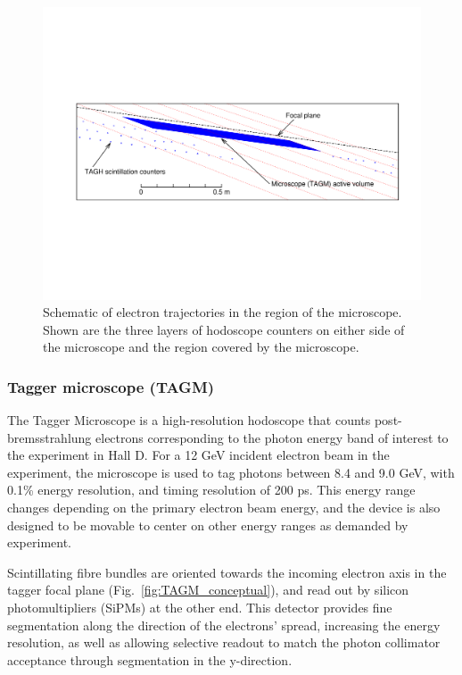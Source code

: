 \begin{figure}[tbp]
\begin{center}
      \includegraphics[width=0.95\linewidth,viewport=80 200 750 400]{figures/BEAM_taggerdetectors.pdf}
\caption{Schematic of electron trajectories in the region of the microscope. Shown are the three layers of hodoscope counters on either side of the microscope and the 
               region covered by the microscope.
       \label{fig:beam:BEAM_taggerdetectors}  }

\end{center}
\end{figure}

\subsubsection{Tagger microscope (TAGM)}\label{sec:TAGM}
The Tagger Microscope is a high-resolution hodoscope that counts post-bremsstrahlung electrons corresponding to the photon energy band of interest to the experiment in Hall D.
For a 12 GeV incident electron beam in the \GX{} experiment, the microscope is used to tag photons between 8.4 and 9.0 GeV, with 0.1\% energy resolution, and timing resolution of 200 ps.
This energy range changes depending on the primary electron beam energy, and the device is also designed to be movable to center on other energy ranges as demanded by experiment.

Scintillating fibre bundles are oriented towards the incoming electron axis in the tagger focal plane (Fig.~\ref{fig:TAGM_conceptual}), and read out by silicon photomultipliers (SiPMs) at the other end.
This detector provides fine segmentation along the direction of the electrons' spread, increasing the energy resolution, as well as allowing selective readout to match the photon collimator acceptance through segmentation in the y-direction.

